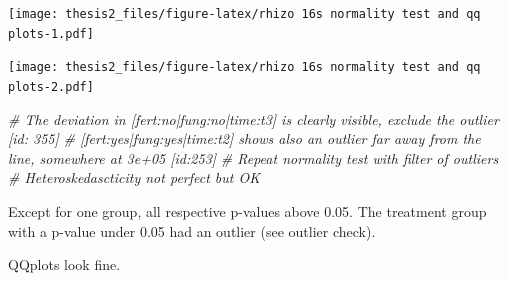 \documentclass[twoside,12pt,final]{ucthesis-CA2012}
\newenvironment{Shaded}{}{}
\newcommand{\KeywordTok}[1]{\textcolor[rgb]{0.00,0.44,0.13}{\textbf{{#1}}}}
\newcommand{\DataTypeTok}[1]{\textcolor[rgb]{0.56,0.13,0.00}{{#1}}}
\newcommand{\StringTok}[1]{\textcolor[rgb]{0.25,0.44,0.63}{{#1}}}
\newcommand{\CommentTok}[1]{\textcolor[rgb]{0.38,0.63,0.69}{\textit{{#1}}}}
\newcommand{\NormalTok}[1]{{#1}}
\newcommand{\OperatorTok}[1]{\textcolor[rgb]{0.00,0.44,0.13}{\textbf{{#1}}}}
\begin{document}
\begin{ucmainmatter}
\begin{Shaded}
\end{Shaded}
\texttt{[image: thesis2\_files/figure-latex/rhizo 16s normality test and qq plots-1.pdf]}
\begin{Shaded}
\end{Shaded}
\texttt{[image: thesis2\_files/figure-latex/rhizo 16s normality test and qq plots-2.pdf]}
\begin{Shaded}
\begin{Highlighting}[]
\CommentTok{# The deviation in [fert:no|fung:no|time:t3] is clearly visible, exclude the outlier [id: 355]}
  \CommentTok{# [fert:yes|fung:yes|time:t2] shows also an outlier far away from the line, somewhere at 3e+05 [id:253]}
  \CommentTok{# Repeat normality test with filter of outliers}
  \CommentTok{# Heteroskedascticity not perfect but OK }
\end{Highlighting}
\end{Shaded}
Except for one group, all respective p-values above 0.05. The treatment group with a p-value under 0.05 had an outlier (see outlier check).

QQplots look fine.


\end{ucmainmatter}
\end{document}
